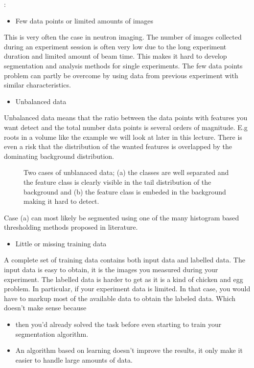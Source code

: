 \documentclass[letterpaper,10pt,english]{sphinxmanual}
\begin{document}
:
\begin{itemize}
\item {} 
Few data points or limited amounts of images

\end{itemize}

This is very often the case in neutron imaging. The number of images collected during an experiment session is often very low due to the long experiment duration and limited amount of beam time. This makes it hard to develop segmentation and analysis methods for single experiments. The few data points problem can partly be overcome by using data from previous experiment with similar characteristics.
\begin{itemize}
\item {} 
Unbalanced data

\end{itemize}

Unbalanced data means that the ratio between the data points with features you want detect and the total number data points is several orders of magnitude. E.g roots in a volume like the example we will look at later in this lecture. There is even a risk that the distribution of the wanted features is overlapped by the dominating background distribution.

\begin{figure}[htbp]
\centering
\capstart

\noindent{}
\caption{Two cases of unblanaced data; (a) the classes are well separated and the feature class is clearly visible in the tail distribution of the background and (b) the feature class is embeded in the background making it hard to detect.}\label{\detokenize{ML4NeutronImageSegmentation:id11}}\end{figure}

Case (a) can most likely be segmented using one of the many histogram based thresholding methods proposed in literature.


\begin{itemize}
\item {} 
Little or missing training data

\end{itemize}

A complete set of training data contains both input data and labelled data. The input data is easy to obtain, it is the images you measured during your experiment. The labelled data is harder to get as it is a kind of chicken and egg problem. In particular, if your experiment data is limited. In that case, you would have to mark\sphinxhyphen{}up most of the available data to obtain the labeled data. Which doesn’t make sense because
\begin{itemize}
\item {} 
then you’d already solved the task before even starting to train your segmentation algorithm.

\item {} 
An algorithm based on learning doesn’t improve the results, it only make it easier to handle large amounts of data.

\end{itemize}
\end{document}
